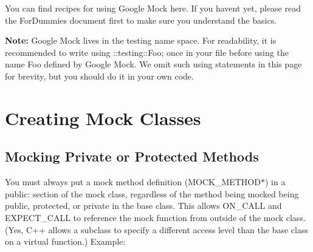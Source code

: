 You can find recipes for using Google Mock here. If you haven\textquotesingle{}t yet, please read the For\+Dummies document first to make sure you understand the basics.

{\bfseries Note\+:} Google Mock lives in the {\ttfamily testing} name space. For readability, it is recommended to write {\ttfamily using \+::testing\+::\+Foo;} once in your file before using the name {\ttfamily Foo} defined by Google Mock. We omit such {\ttfamily using} statements in this page for brevity, but you should do it in your own code.

\section*{Creating Mock Classes}

\subsection*{Mocking Private or Protected Methods}

You must always put a mock method definition ({\ttfamily M\+O\+C\+K\+\_\+\+M\+E\+T\+H\+O\+D$\ast$}) in a {\ttfamily public\+:} section of the mock class, regardless of the method being mocked being {\ttfamily public}, {\ttfamily protected}, or {\ttfamily private} in the base class. This allows {\ttfamily O\+N\+\_\+\+C\+A\+LL} and {\ttfamily E\+X\+P\+E\+C\+T\+\_\+\+C\+A\+LL} to reference the mock function from outside of the mock class. (Yes, C++ allows a subclass to specify a different access level than the base class on a virtual function.) Example\+:


\begin{DoxyCode}{0}
\DoxyCodeLine{}
\DoxyCodeLine{}
\DoxyCodeLine{\};}
\DoxyCodeLine{}
\DoxyCodeLine{}
\DoxyCodeLine{\};}
\end{DoxyCode}


